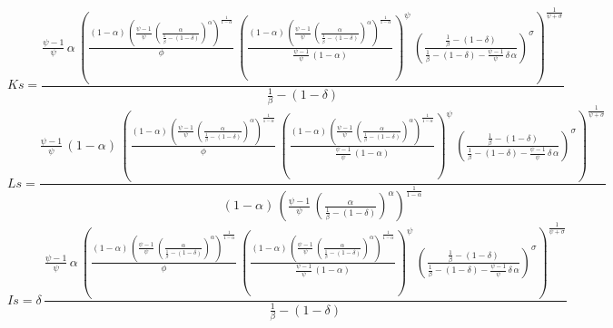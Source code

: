 \begin{dmath*}
Ks = \frac{\frac{{{\psi}}-1}{{{\psi}}}\, {{\alpha}}\, \left(\frac{\left(1-{{\alpha}}\right)\, \left(\frac{{{\psi}}-1}{{{\psi}}}\, \left(\frac{{{\alpha}}}{\frac{1}{{{\beta}}}-\left(1-{{\delta}}\right)}\right)^{{{\alpha}}}\right)^{\frac{1}{1-{{\alpha}}}}}{{{\phi}}}\, \left(\frac{\left(1-{{\alpha}}\right)\, \left(\frac{{{\psi}}-1}{{{\psi}}}\, \left(\frac{{{\alpha}}}{\frac{1}{{{\beta}}}-\left(1-{{\delta}}\right)}\right)^{{{\alpha}}}\right)^{\frac{1}{1-{{\alpha}}}}}{\frac{{{\psi}}-1}{{{\psi}}}\, \left(1-{{\alpha}}\right)}\right)^{{{\psi}}}\, \left(\frac{\frac{1}{{{\beta}}}-\left(1-{{\delta}}\right)}{\frac{1}{{{\beta}}}-\left(1-{{\delta}}\right)-\frac{{{\psi}}-1}{{{\psi}}}\, {{\delta}}\, {{\alpha}}}\right)^{{{\sigma}}}\right)^{\frac{1}{{{\psi}}+{{\sigma}}}}}{\frac{1}{{{\beta}}}-\left(1-{{\delta}}\right)}
\end{dmath*}
\begin{dmath*}
Ls = \frac{\frac{{{\psi}}-1}{{{\psi}}}\, \left(1-{{\alpha}}\right)\, \left(\frac{\left(1-{{\alpha}}\right)\, \left(\frac{{{\psi}}-1}{{{\psi}}}\, \left(\frac{{{\alpha}}}{\frac{1}{{{\beta}}}-\left(1-{{\delta}}\right)}\right)^{{{\alpha}}}\right)^{\frac{1}{1-{{\alpha}}}}}{{{\phi}}}\, \left(\frac{\left(1-{{\alpha}}\right)\, \left(\frac{{{\psi}}-1}{{{\psi}}}\, \left(\frac{{{\alpha}}}{\frac{1}{{{\beta}}}-\left(1-{{\delta}}\right)}\right)^{{{\alpha}}}\right)^{\frac{1}{1-{{\alpha}}}}}{\frac{{{\psi}}-1}{{{\psi}}}\, \left(1-{{\alpha}}\right)}\right)^{{{\psi}}}\, \left(\frac{\frac{1}{{{\beta}}}-\left(1-{{\delta}}\right)}{\frac{1}{{{\beta}}}-\left(1-{{\delta}}\right)-\frac{{{\psi}}-1}{{{\psi}}}\, {{\delta}}\, {{\alpha}}}\right)^{{{\sigma}}}\right)^{\frac{1}{{{\psi}}+{{\sigma}}}}}{\left(1-{{\alpha}}\right)\, \left(\frac{{{\psi}}-1}{{{\psi}}}\, \left(\frac{{{\alpha}}}{\frac{1}{{{\beta}}}-\left(1-{{\delta}}\right)}\right)^{{{\alpha}}}\right)^{\frac{1}{1-{{\alpha}}}}}
\end{dmath*}
\begin{dmath*}
Is = {{\delta}}\, \frac{\frac{{{\psi}}-1}{{{\psi}}}\, {{\alpha}}\, \left(\frac{\left(1-{{\alpha}}\right)\, \left(\frac{{{\psi}}-1}{{{\psi}}}\, \left(\frac{{{\alpha}}}{\frac{1}{{{\beta}}}-\left(1-{{\delta}}\right)}\right)^{{{\alpha}}}\right)^{\frac{1}{1-{{\alpha}}}}}{{{\phi}}}\, \left(\frac{\left(1-{{\alpha}}\right)\, \left(\frac{{{\psi}}-1}{{{\psi}}}\, \left(\frac{{{\alpha}}}{\frac{1}{{{\beta}}}-\left(1-{{\delta}}\right)}\right)^{{{\alpha}}}\right)^{\frac{1}{1-{{\alpha}}}}}{\frac{{{\psi}}-1}{{{\psi}}}\, \left(1-{{\alpha}}\right)}\right)^{{{\psi}}}\, \left(\frac{\frac{1}{{{\beta}}}-\left(1-{{\delta}}\right)}{\frac{1}{{{\beta}}}-\left(1-{{\delta}}\right)-\frac{{{\psi}}-1}{{{\psi}}}\, {{\delta}}\, {{\alpha}}}\right)^{{{\sigma}}}\right)^{\frac{1}{{{\psi}}+{{\sigma}}}}}{\frac{1}{{{\beta}}}-\left(1-{{\delta}}\right)}
\end{dmath*}
